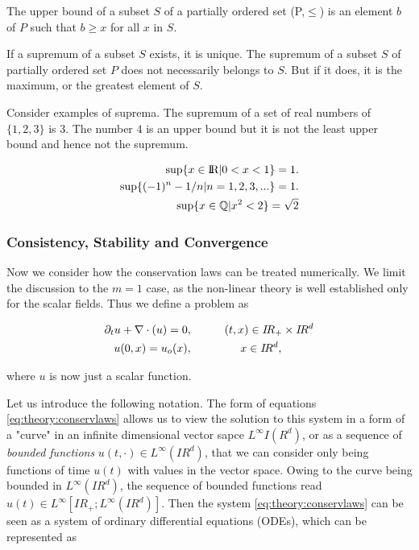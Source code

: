 The upper bound of a subset $S$ of a partially ordered set (P,$\leq$) is an element $b$ of $P$ such that $b\geq x$ for all $x$ in $S$. 

If a supremum of a subset $S$ exists, it is unique. 
The supremum of a subset $S$ of partially ordered set $P$ does not necessarily belongs to $S$. But if it does, it is the maximum, or the greatest element of $S$. 

Consider examples of suprema. The supremum of a set of real numbers of $\{1,2,3\}$ is $3$. The number $4$ is an upper bound but it is not the least upper bound and hence not the supremum. 

\begin{align}
\sup\{x\in\text{I\!R}|0<x<1\} = 1. \\
\sup\{(-1)^n - 1/n | n = 1,2,3,... \} = 1. \\
\sup\{x\in\mathbb{Q} | x^2 < 2\} = \sqrt{2}
\end{align}


\subsubsection{Consistency, Stability and Convergence}


Now we consider how the conservation laws can be treated numerically. 
We limit the discussion to the $m=1$ case, as the non-linear theory is well established only for the scalar fields. 
Thus we define a problem as 

\begin{align}
\partial_t u + \nabla\cdot\boldmath(u) = 0&, \hspace{10mm} (t,x) \in I\!R_{+}\times I\! R^d \\ 
u(0, x) = u_o(x)&, \hspace{15mm} x\in I\!R^{d},
\end{align}

where $u$ is now just a scalar function. 

Let us introduce the following notation. 
The form of equations \ref{eq:theory:conservlaws} allows us to view the solution to this system in a form of a "curve" in an infinite dimensional vector sapce $L^{\infty}I\!(R^d)$, or as a sequence of \textit{bounded functions} $u(t,\cdot)\in L^{\infty}(I\! R^d)$, that we can consider only being functions of time $u(t)$ with values in the vector space. 
Owing to the curve being bounded in $L^{\infty}(I\!R^d)$, the sequence of bounded functions read $u(t)\in L^{\infty}[I\!R_{+};L^{\infty}(I\!R^d)]$. 
Then the system  \ref{eq:theory:conservlaws} can be seen as a system of ordinary differential equations (ODEs), which can be represented as 

